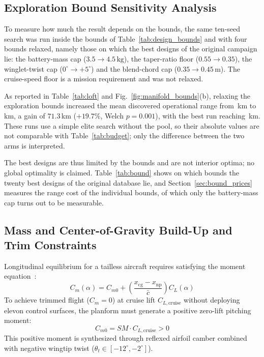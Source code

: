 \subsection{Exploration Bound Sensitivity Analysis}
\label{sec:bound_sensitivity}
To measure how much the result depends on the bounds, the same ten-seed search was run inside the bounds of Table~\ref{tab:design_bounds} and with four bounds relaxed, namely those on which the best designs of the original campaign lie: the battery-mass cap ($3.5 \to 4.5\,\mathrm{kg}$), the taper-ratio floor ($0.55 \to 0.35$), the winglet-twist cap ($0^\circ \to +5^\circ$) and the blend-chord cap ($0.35 \to 0.45\,\mathrm{m}$). The cruise-speed floor is a mission requirement and was not relaxed.

As reported in Table~\ref{tab:loft} and Fig.~\ref{fig:manifold_bounds}(b), relaxing the exploration bounds increased the mean discovered operational range from \NpaperBndMean\,km to \NwideBndMean\,km, a gain of $71.3$\,km ($+19.7\%$, Welch $p = 0.001$), with the best run reaching \NwideBndMax\,km. These runs use a simple elite search without the pool, so their absolute values are not comparable with Table~\ref{tab:budget}; only the difference between the two arms is interpreted.

The best designs are thus limited by the bounds and are not interior optima; no global optimality is claimed. Table~\ref{tab:bound} shows on which bounds the twenty best designs of the original database lie, and Section~\ref{sec:bound_prices} measures the range cost of the individual bounds, of which only the battery-mass cap turns out to be measurable.

\subsection{Mass and Center-of-Gravity Build-Up and Trim Constraints}
\label{sec:dynamic_balance}
Longitudinal equilibrium for a tailless aircraft requires satisfying the moment equation~\cite{nelson1998flight}:
\begin{equation}
C_m(\alpha) = C_{m0} + \left(\frac{x_{\mathrm{cg}} - x_{\mathrm{np}}}{\bar{c}}\right) C_L(\alpha)
\end{equation}
To achieve trimmed flight ($C_m = 0$) at cruise lift $C_{L,\mathrm{cruise}}$ without deploying elevon control surfaces, the planform must generate a positive zero-lift pitching moment:
\begin{equation}
C_{m0} = SM \cdot C_{L,\mathrm{cruise}} > 0
\label{eq:trim_req}
\end{equation}
This positive moment is synthesized through reflexed airfoil camber combined with negative wingtip twist ($\theta_t \in [-12^\circ, -2^\circ]$).

